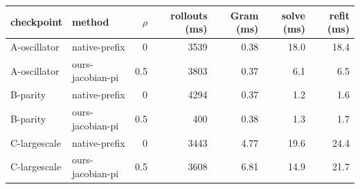 {\scriptsize\setlength{\tabcolsep}{3pt}
\begin{tabular}{llrrrrr}
\toprule
checkpoint & method & $\rho$ & rollouts (ms) & Gram (ms) & solve (ms) & refit (ms) \\
\midrule
A-oscillator & native-prefix & 0 & 3539 & 0.38 & 18.0 & 18.4 \\
A-oscillator & ours-jacobian-pi & 0.5 & 3803 & 0.37 & 6.1 & 6.5 \\
\midrule
B-parity & native-prefix & 0 & 4294 & 0.37 & 1.2 & 1.6 \\
B-parity & ours-jacobian-pi & 0.5 & 400 & 0.38 & 1.3 & 1.7 \\
\midrule
C-largescale & native-prefix & 0 & 3443 & 4.77 & 19.6 & 24.4 \\
C-largescale & ours-jacobian-pi & 0.5 & 3608 & 6.81 & 14.9 & 21.7 \\
\bottomrule
\end{tabular}}
